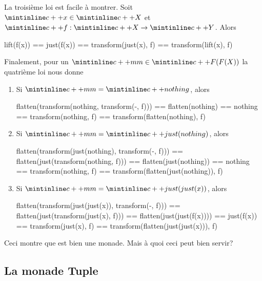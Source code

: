 La troisième loi est facile à montrer. Soit $\cc{x} \in \cc{X}$ et
$\cc{f} : \cc{X} \to \cc{Y}$. Alors
\begin{cpp}
    lift(f(x)) == just(f(x))
               == transform(just(x), f)
               == transform(lift(x), f)
\end{cpp}

Finalement, pour un $\cc{mm} \in \cc{F(F(X))}$ la quatrième loi nous donne
\begin{enumerate}
    \item Si $\cc{mm} = \cc{nothing}$, alors
    \begin{cpp}
        flatten(transform(nothing, transform(-, f)))
            == flatten(nothing)
            == nothing
            == transform(nothing, f)
            == transform(flatten(nothing), f)
    \end{cpp}

    \item Si $\cc{mm} = \cc{just(nothing)}$, alors
    \begin{cpp}
        flatten(transform(just(nothing), transform(-, f)))
            == flatten(just(transform(nothing, f)))
            == flatten(just(nothing))
            == nothing
            == transform(nothing, f)
            == transform(flatten(just(nothing)), f)
    \end{cpp}

    \item Si $\cc{mm} = \cc{just(just(x))}$, alors
    \begin{cpp}
        flatten(transform(just(just(x)), transform(-, f)))
            == flatten(just(transform(just(x), f)))
            == flatten(just(just(f(x))))
            == just(f(x))
            == transform(just(x), f)
            == transform(flatten(just(just(x))), f)
    \end{cpp}
\end{enumerate}

Ceci montre que  est bien une monade. Mais à quoi ceci peut bien
servir?



\subsection{La monade Tuple}
